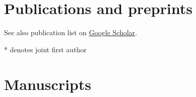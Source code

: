 \documentclass[margin, line]{res}
\begin{document}
\newrefcontext[sorting = dymdt]
\nocite{*}

\section{Publications and preprints}

See also publication list on \href{https://scholar.google.com/citations?hl=en&user=YrX1Z8MAAAAJ}{Google Scholar}.

* denotes joint first author \newline

\printbibliography[heading = none, type = article]

\section{Manuscripts}
\printbibliography[heading = none, keyword = prep]
\end{document}
